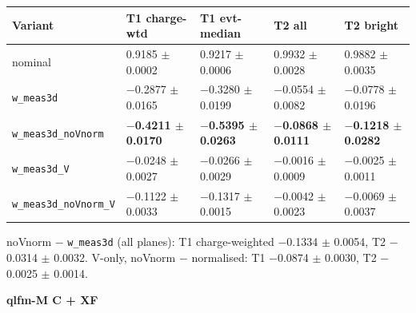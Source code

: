 \documentclass[10pt,a4paper]{article}
\begin{document}
\begin{center}\footnotesize
\setlength{\tabcolsep}{3pt}\renewcommand{\arraystretch}{1.15}
\begin{tabularx}{\linewidth}{LLLLL}
\toprule
\textbf{Variant} & \textbf{T1 charge-wtd} & \textbf{T1 evt-median} & \textbf{T2 all} & \textbf{T2 bright} \\
\midrule
nominal & 0.9185 $\pm$ 0.0002 & 0.9217 $\pm$ 0.0006 & 0.9932 $\pm$ 0.0028 & 0.9882 $\pm$ 0.0035 \\
\texttt{w\_\allowbreak{}meas3d} & $-$0.2877 $\pm$ 0.0165 & $-$0.3280 $\pm$ 0.0199 & $-$0.0554 $\pm$ 0.0082 & $-$0.0778 $\pm$ 0.0196 \\
\texttt{w\_\allowbreak{}meas3d\_\allowbreak{}noVnorm} & \textbf{$-$0.4211 $\pm$ 0.0170} & \textbf{$-$0.5395 $\pm$ 0.0263} & \textbf{$-$0.0868 $\pm$ 0.0111} & \textbf{$-$0.1218 $\pm$ 0.0282} \\
\texttt{w\_\allowbreak{}meas3d\_\allowbreak{}V} & $-$0.0248 $\pm$ 0.0027 & $-$0.0266 $\pm$ 0.0029 & $-$0.0016 $\pm$ 0.0009 & $-$0.0025 $\pm$ 0.0011 \\
\texttt{w\_\allowbreak{}meas3d\_\allowbreak{}noVnorm\_\allowbreak{}V} & $-$0.1122 $\pm$ 0.0033 & $-$0.1317 $\pm$ 0.0015 & $-$0.0042 $\pm$ 0.0023 & $-$0.0069 $\pm$ 0.0037 \\
\bottomrule
\end{tabularx}
\end{center}
noVnorm $-$ \texttt{w\_\allowbreak{}meas3d} (all planes): T1 charge-weighted $-$0.1334 $\pm$ 0.0054, T2 $-$0.0314 $\pm$ 0.0032. V-only, noVnorm $-$ normalised: T1 $-$0.0874 $\pm$ 0.0030, T2 $-$0.0025 $\pm$ 0.0014.

\textbf{qlfm-M C + XF}
\end{document}
